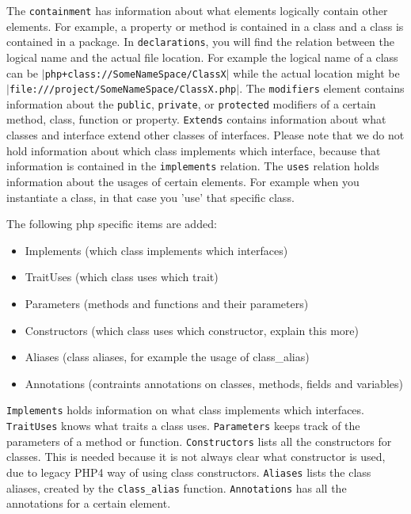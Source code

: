 \documentclass[../main.tex]{subfiles}
\begin{document}
    The \texttt{containment} has information about what elements logically contain other elements.
    For example, a property or method is contained in a class and a class is contained in a package.
    In \texttt{declarations}, you will find the relation between the logical name and the actual file location. 
    For example the logical name of a class can be \texttt{$\vert$php+class://SomeNameSpace/ClassX$\vert$} while the actual location might be \texttt{$\vert$file:///project/SomeNameSpace/ClassX.php$\vert$}.
    The \texttt{modifiers} element contains information about the \texttt{public}, \texttt{private}, or \texttt{protected} modifiers of a certain method, class, function or property.
    \texttt{Extends} contains information about what classes and interface extend other classes of interfaces. Please note that we do not hold information about which class implements which interface, because that information is contained in the \texttt{implements} relation.
    The \texttt{uses} relation holds information about the usages of certain elements.
    For example when you instantiate a class, in that case you 'use' that specific class.
    
    The following php specific items are added:
    \begin{itemize}
        \item Implements (which class implements which interfaces)
        \item TraitUses (which class uses which trait)
        \item Parameters (methods and functions and their parameters)
        \item Constructors (which class uses which constructor, explain this more)
        \item Aliases (class aliases, for example the usage of class\_{}alias)
        \item Annotations (contraints annotations on classes, methods, fields and variables)
    \end{itemize}
    \texttt{Implements} holds information on what class implements which interfaces.
    \texttt{TraitUses} knows what traits a class uses.
    \texttt{Parameters} keeps track of the parameters of a method or function.
    \texttt{Constructors} lists all the constructors for classes. This is needed because it is not always clear what constructor is used, due to legacy PHP4 way of using class constructors.
    \texttt{Aliases} lists the class aliases, created by the \texttt{class\_alias} function. 
    \texttt{Annotations} has all the annotations for a certain element.
    
\end{document}

